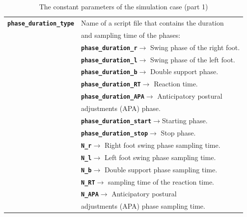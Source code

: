 \documentclass[12pt,oneside,notitlepage,abstracton,a4paper]{scrartcl}
\begin{document}
\begin{table}[!htbp]
\begin{center}
\begin{tabular}{|l|l|}
             & \\  \hline
  \textbf{\texttt{phase\_duration\_type}}         & Name of a script file that contains the duration \\ 
             & and sampling time of the phases:\\  
             & \textbf{\texttt{phase\_duration\_r}}$\rightarrow$ Swing phase of the right foot.\\  
             & \textbf{\texttt{phase\_duration\_l}}$\rightarrow$ Swing phase of the left foot.\\  
             & \textbf{\texttt{phase\_duration\_b}}$\rightarrow$ Double support phase.\\  
             & \textbf{\texttt{phase\_duration\_RT}}$\rightarrow$  Reaction time. \\  
             & \textbf{\texttt{phase\_duration\_APA}}$\rightarrow$ Anticipatory postural\\ 
             & adjustments (APA) phase.\\  
             & \textbf{\texttt{phase\_duration\_start}}$\rightarrow$Starting phase.\\  
             & \textbf{\texttt{phase\_duration\_stop}}$\rightarrow$ Stop phase.\\
             & \textbf{\texttt{N\_r}}$\rightarrow$ Right foot swing phase sampling time. \\  
             & \textbf{\texttt{N\_l}}$\rightarrow$ Left foot swing phase sampling time. \\  
             & \textbf{\texttt{N\_b}}$\rightarrow$ Double support phase sampling time.\\  
             & \textbf{\texttt{N\_RT}}$\rightarrow$   sampling time of the reaction time. \\  
             & \textbf{\texttt{N\_APA}}$\rightarrow$ Anticipatory postural\\  
             & adjustments (APA) phase sampling time.\\   \hline  
\end{tabular}
\caption {The constant parameters of the simulation case (part 1)}
\label{tbl:paras1}
\end{center}
\end{table}
\end{document}
